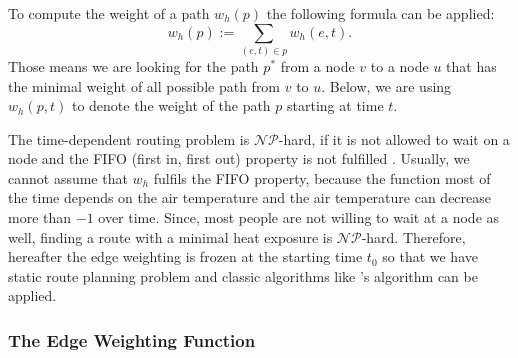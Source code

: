 To compute the weight of a path $w_h(p)$ the following formula can be applied:
	\begin{equation}\label{eq:path-weight}
		w_h(p) := \sum_{(e,t) \in p} w_h(e, t).
	\end{equation}
Those means we are looking for the path $p^*$ from a node $v$ to a node $u$ that has the minimal weight of all possible path from $v$ to $u$. Below, we are using $w_h(p, t)$ to denote the weight of the path $p$ starting at time $t$. 

The time-dependent routing problem is $\mathcal{NP}$-hard, if it is not allowed to wait on a node and the FIFO (first in, first out) property is not fulfilled \parencite{Orda1990,Ahn1991}. 
Usually, we cannot assume that $w_h$ fulfils the FIFO property, because the function most of the time depends on the air temperature and the air temperature can decrease more than $-1$ over time. Since, most people are not willing to wait at a node as well, finding a route with a minimal heat exposure is $\mathcal{NP}$-hard. Therefore, 
hereafter the edge weighting is frozen at the starting time $t_0$ so that we have static route planning problem and classic algorithms like  \citeauthor{Dijkstra1959}'s algorithm \parencite{Dijkstra1959} can be applied. 



\subsubsection{The Edge Weighting Function \label{sec:edge-weighting}}

